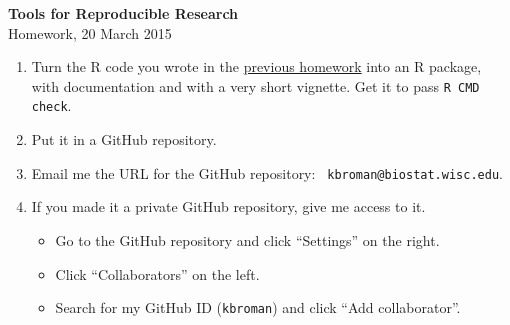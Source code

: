 \documentclass[12pt]{article}
\newcommand{\ttsm}{\tt \small}
\begin{document}
\thispagestyle{empty}

\textbf{Tools for Reproducible Research} \\
Homework, 20 March 2015

\bigskip

\begin{enumerate}
\item Turn the R code you wrote in the
  \href{http://kbroman.org/Tools4RR/assets/homework/08_homework.pdf}{previous
    homework} into an R package, with documentation and with a very
  short vignette. Get it to pass {\ttsm R CMD check}.

\item Put it in a GitHub repository.

\item Email me the URL for the GitHub repository: {\ttsm
  kbroman@biostat.wisc.edu}.

\item If you made it a private GitHub repository, give me access to
  it.
  \begin{itemize}
  \item Go to the GitHub repository and click ``Settings'' on the
    right.
  \item Click ``Collaborators'' on the left.
  \item Search for my GitHub ID ({\ttsm kbroman}) and click ``Add
    collaborator''.
  \end{itemize}


\end{enumerate}
\end{document}
